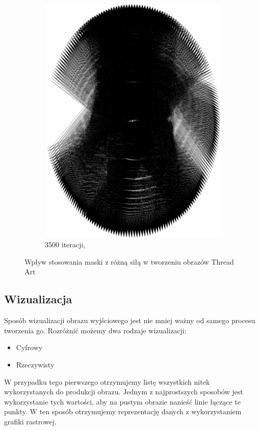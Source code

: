 \documentclass[a4paper, 12pt, polish, twoside]{extreport}
\begin{document}
\begin{figure}[H]
\begin{subfigure}{0.19\textwidth}
            \includegraphics[width = \textwidth]{img/2-theory/aldrin/100mask-aldrin_ellipse_3500_threaded.png}
            \caption{3500 iteracji, }
            \label{przyklad-aldrin-t}
        \end{subfigure}
        \caption{Wpływ stosowania maski z różną siłą w tworzeniu obrazów Thread Art}
        \label{przyklad-aldrin}
        \end{figure}
        
        \subsection{Wizualizacja}  \label{theory-technics-vis}
        Sposób wizualizacji obrazu wyjściowego jest nie mniej ważny od samego procesu tworzenia go. Rozróżnić możemy dwa rodzaje wizualizacji:
        \begin{itemize}
            \item Cyfrowy
            \item Rzeczywisty
        \end{itemize}
        W przypadku tego pierwszego otrzymujemy listę wszystkich nitek wykorzystanych do produkcji obrazu. Jednym z najprostszych sposobów jest wykorzystanie tych wartości, aby na pustym obrazie nanieść linie łączące te punkty. W ten sposób otrzymujemy reprezentację danych z wykorzystaniem grafiki rastrowej.
        
\end{document}
